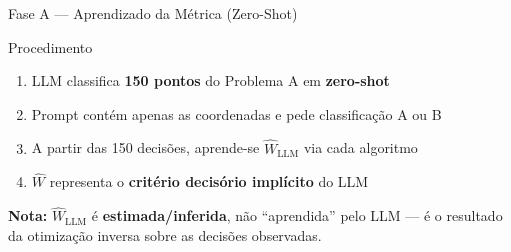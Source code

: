 \documentclass[aspectratio=169,12pt]{beamer}
\begin{document}

\begin{frame}{Fase A --- Aprendizado da Métrica (Zero-Shot)}
\begin{block}{Procedimento}
\begin{enumerate}
    \item LLM classifica \textbf{150 pontos} do Problema A em \textbf{zero-shot}
    \item Prompt contém apenas as coordenadas e pede classificação A ou B
    \item A partir das 150 decisões, aprende-se $\hat{W}_{\text{LLM}}$ via cada algoritmo
    \item $\hat{W}$ representa o \textbf{critério decisório implícito} do LLM
\end{enumerate}
\end{block}

\vspace{0.3cm}
\textbf{Nota:} $\hat{W}_{\text{LLM}}$ é \textbf{estimada/inferida}, não ``aprendida'' pelo LLM --- é o resultado da otimização inversa sobre as decisões observadas.
\end{frame}
\end{document}
